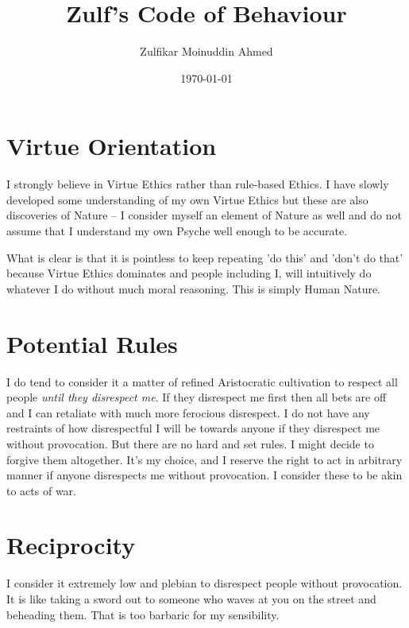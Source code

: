 \documentclass{amsart}
\title{Zulf's Code of Behaviour}
\author{Zulfikar Moinuddin Ahmed}
\date{\today}
\begin{document}
\maketitle

\section{Virtue Orientation}

I strongly believe in Virtue Ethics rather than rule-based Ethics.  I have slowly developed some understanding of my own Virtue Ethics but these are also discoveries of Nature -- I consider myself an element of Nature as well and do not assume that I understand my own Psyche well enough to be accurate.

What is clear is that it is pointless to keep repeating 'do this' and 'don't do that' because Virtue Ethics dominates and people including I, will intuitively do whatever I do without much moral reasoning.  This is  simply Human Nature.

\section{Potential Rules}

I do tend to consider it a matter of refined Aristocratic cultivation to respect all people {\em until they disrespect me}.  If they disrespect me first then all bets are off and I can retaliate with much more ferocious disrespect.  I do not have any restraints of how disrespectful I will be towards anyone if they disrespect me without provocation.  But there are no hard and set rules.  I might decide to forgive them altogether.  It's my choice, and I reserve the right to act in arbitrary manner if anyone disrespects me without provocation.  I consider these to be akin to acts of war.

\section{Reciprocity}

I consider it extremely low and plebian to disrespect people without provocation.  It is like taking a sword out to someone who waves at you on the street and beheading them.  That is too barbaric for my sensibility.  
\end{document}
